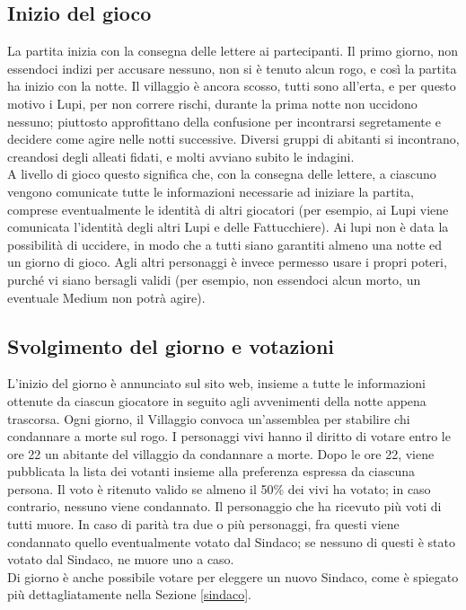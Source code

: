 \documentclass[a4paper,10pt]{article}
\begin{document}
\subsection{Inizio del gioco}

La partita inizia con la consegna delle lettere ai partecipanti. Il primo giorno, non essendoci indizi per accusare nessuno, non si è tenuto alcun rogo, e così la partita ha inizio con la notte. Il villaggio è ancora scosso, tutti sono all'erta, e per questo motivo i Lupi, per non correre rischi, durante la prima notte non uccidono nessuno; piuttosto approfittano della confusione per incontrarsi segretamente e decidere come agire nelle notti successive. Diversi gruppi di abitanti si incontrano, creandosi degli alleati fidati, e molti avviano subito le indagini.\vspace{1.5 mm} \\
A livello di gioco questo significa che, con la consegna delle lettere, a ciascuno vengono comunicate tutte le informazioni necessarie ad iniziare la partita, comprese eventualmente le identità di altri giocatori (per esempio, ai Lupi viene comunicata l'identità degli altri Lupi e delle Fattucchiere). Ai lupi non è data la possibilità di uccidere, in modo che a tutti siano garantiti almeno una notte ed un giorno di gioco. Agli altri personaggi è invece permesso usare i propri poteri, purché vi siano bersagli validi (per esempio, non essendoci alcun morto, un eventuale Medium non potrà agire).

\subsection{Svolgimento del giorno e votazioni}

L'inizio del giorno è annunciato sul sito web, insieme a tutte le informazioni
ottenute da ciascun giocatore in seguito agli avvenimenti della notte appena
trascorsa.
Ogni giorno, il Villaggio convoca un'assemblea per stabilire chi condannare a
morte sul rogo.
I personaggi vivi hanno il diritto di votare entro le ore 22 un abitante del
villaggio da condannare a morte. Dopo le ore 22, viene pubblicata la lista dei
votanti insieme alla preferenza espressa da ciascuna persona.
Il voto è ritenuto valido se almeno il 50\% dei vivi ha votato; in caso
contrario, nessuno viene condannato. Il personaggio che ha ricevuto più voti di
tutti muore.
In caso di parità tra due o più personaggi, fra questi viene condannato quello
eventualmente votato dal Sindaco; se nessuno di questi è stato votato dal
Sindaco, ne muore uno a caso.
\\
Di giorno è anche possibile votare per eleggere un nuovo Sindaco, come è
spiegato più dettagliatamente nella Sezione \ref{sindaco}.
\end{document}

